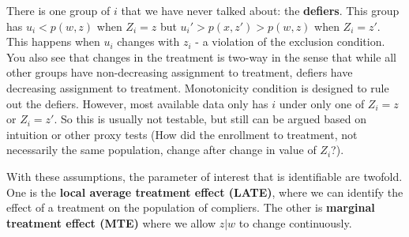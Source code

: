 \documentclass[12pt]{article}
\theoremstyle{definition}
\theoremstyle{property}
\theoremstyle{assumption}
\theoremstyle{example}
\theoremstyle{comment}
\begin{document}
\par
There is one group of $i$ that we have never talked about: the \textbf{defiers}. This group has $u_i<p(w,z)$ when $Z_i=z$ but $u_i'>p(x,z')>p(w,z)$ when $Z_i=z'$. This happens when  $u_i$ changes with $z_i$ - a violation of the exclusion condition. You also see that changes in the treatment is two-way in the sense that while all other groups have non-decreasing assignment to treatment, defiers have decreasing assignment to treatment. Monotonicity condition is designed to rule out the defiers. However, most available data only has $i$ under only one of $Z_i=z$ or $Z_i=z'$. So this is usually not testable, but still can be argued based on intuition or other proxy tests (How did the enrollment to treatment, not necessarily the same population, change after change in value of $Z_i$?).
\par
With these assumptions, the parameter of interest that is identifiable are twofold. One is the \textbf{local average treatment effect (LATE)}, where we can identify the effect of a treatment on the population of compliers. The other is \textbf{marginal treatment effect (MTE)} where we allow $z|w$ to change continuously. 
\end{document}
